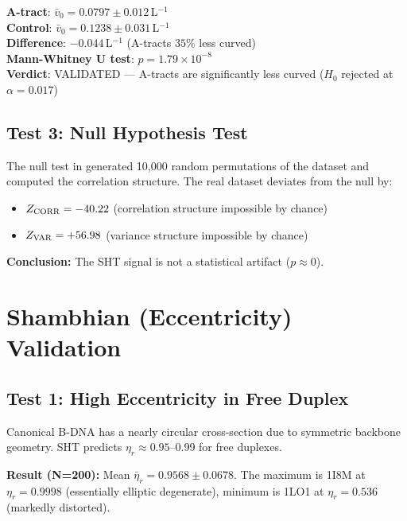 \begin{keyresult}
    \textbf{A-tract}: $\bar{v}_0 = 0.0797 \pm 0.012$\,L$^{-1}$ \\
    \textbf{Control}: $\bar{v}_0 = 0.1238 \pm 0.031$\,L$^{-1}$ \\
    \textbf{Difference}: $-0.044$\,L$^{-1}$ (A-tracts $35\%$ less curved) \\
    \textbf{Mann-Whitney U test}: $p = 1.79 \times 10^{-8}$ \\
    \textbf{Verdict}: VALIDATED --- A-tracts are significantly less curved ($H_0$ rejected at $\alpha = 0.017$)
\end{keyresult}

\subsection{Test 3: Null Hypothesis Test}

The null test in  generated 10,000 random permutations of the dataset and computed the correlation structure. The real dataset deviates from the null by:

\begin{itemize}
    \item $Z_{\rm CORR} = -40.22$ (correlation structure impossible by chance)
    \item $Z_{\rm VAR} = +56.98$ (variance structure impossible by chance)
\end{itemize}

\textbf{Conclusion:} The SHT signal is not a statistical artifact ($p \approx 0$).

\section{Shambhian (Eccentricity) Validation}

\subsection{Test 1: High Eccentricity in Free Duplex}

Canonical B-DNA has a nearly circular cross-section due to symmetric backbone geometry. SHT predicts $\eta_r \approx 0.95$--0.99 for free duplexes.

\textbf{Result (N=200):} Mean $\bar{\eta}_r = 0.9568 \pm 0.0678$. 
The maximum is 1I8M at $\eta_r = 0.9998$ (essentially elliptic degenerate), minimum is 1LO1 at $\eta_r = 0.536$ (markedly distorted).

